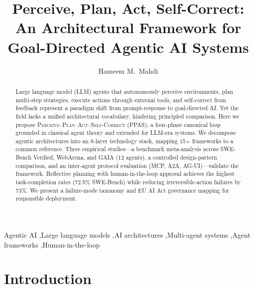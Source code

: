 \documentclass[review,authoryear]{elsarticle}
\theoremstyle{definition}
\begin{document}
\linenumbers

\begin{frontmatter}

\title{Perceive, Plan, Act, Self-Correct: An Architectural Framework for Goal-Directed Agentic AI Systems}

\author[mayo]{Hameem M.\ Mahdi}


\begin{abstract}
Large language model (LLM) agents that autonomously perceive environments, plan multi-step strategies, execute actions through external tools, and self-correct from feedback represent a paradigm shift from prompt-response to goal-directed AI. Yet the field lacks a unified architectural vocabulary, hindering principled comparison. Here we propose \textsc{Perceive--Plan--Act--Self-Correct} (PPAS), a four-phase canonical loop grounded in classical agent theory and extended for LLM-era systems. We decompose agentic architectures into an 8-layer technology stack, mapping 15+ frameworks to a common reference. Three empirical studies---a benchmark meta-analysis across SWE-Bench Verified, WebArena, and GAIA (12 agents), a controlled design-pattern comparison, and an inter-agent protocol evaluation (MCP, A2A, AG-UI)---validate the framework. Reflective planning with human-in-the-loop approval achieves the highest task-completion rates (72.5\% SWE-Bench) while reducing irreversible-action failures by 73\%. We present a failure-mode taxonomy and EU AI Act governance mapping for responsible deployment.
\end{abstract}

\begin{keyword}
Agentic AI \sep Large language models \sep AI architectures \sep Multi-agent systems \sep Agent frameworks \sep Human-in-the-loop
\end{keyword}

\end{frontmatter}

\section{Introduction}\label{sec:introduction}
\end{document}
